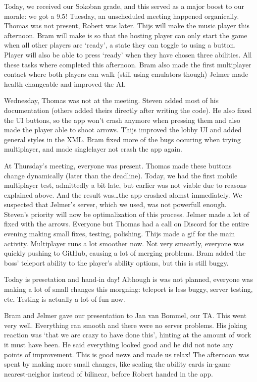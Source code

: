 \documentclass[../main.tex]{subfiles}
\begin{document}
Today, we received our Sokoban grade, and this served as a major boost to our morale: we got a 9.5! 
\bigbreak\noindent
Tuesday, an unscheduled meeting happened organically. Thomas was not present, Robert was later. Thijs will make the music player this afternoon. Bram will make is so that the hosting player can only start the game when all other players are `ready', a state they can toggle to using a button. Player will also be able to press `ready' when they have chosen three abilities. All these tasks where completed this afternoon. Bram also made the first multiplayer contact where both players can walk (still using emulators though) Jelmer made health changeable and improved the AI.

\bigbreak\noindent
Wednesday, Thomas was not at the meeting. Steven added most of his documentation (others added theirs directly after writing the code). He also fixed the UI buttons, so the app won't crash anymore when pressing them and also made the player able to shoot arrows. Thijs improved the lobby UI and added general styles in the XML. Bram fixed more of the bugs occuring when trying multiplayer, and made singlelayer not crash the app again. 

\bigbreak\noindent
At Thursday's meeting, everyone was present. Thomas made these buttons change dynamically (later than the deadline). Today, we had the first mobile multiplayer test, admittedly a bit late, but earlier was not viable due to reasons explained above. And the result was\dots the app crashed alomst immediately. We suspected that Jelmer's server, which we used, was not powerfull enough. Steven's priority will now be optimalization of this process. Jelmer made a lot of  fixed with the arrows. Everyone but Thomas had a call on Discord for the entire evening making small fixes, testing, polishing. Thijs made a gif for the main activity. Multiplayer runs a lot smoother now. Not very smeartly, everyone was quickly pushing to GitHub, causing a lot of merging problems. Bram added the boss' teleport ability to the player's ability options, but this is still buggy.

\bigbreak\noindent
Today is presetation and hand-in day! Although is was not planned, everyone was making a lot of small changes this morgning: teleport is less buggy, server testing, etc. Testing is actually a lot of fun now.

Bram and Jelmer gave our presentation to Jan van Bommel, our TA. This went very well. Everything ran smooth and there were no server problems. His joking reaction was `that we are crazy to have done this', hinting at the amount of work it must have been. He said everything looked good and he did not note any points of improvement. This is good news and made us relax! The afternoon was spent by making more small changes, like scaling the ability cards in-game nearest-neighor instead of bilinear, before Robert handed in the app.
\end{document}
